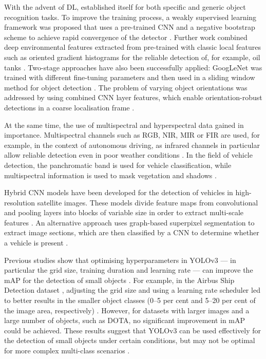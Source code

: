 With the advent of \Acrlong{DL},  established itself for both specific and generic object recognition tasks. To improve the training process, a weakly supervised learning framework was proposed that uses a pre-trained \acrshort{CNN} and a negative bootstrap scheme to achieve rapid convergence of the detector \cite{Zhou2016}. Further work combined deep environmental features extracted from pre-trained  with classic local features such as oriented gradient histograms \cite{Dalal2005} for the reliable detection of, for example, oil tanks \cite{Zhang2015}. Two-stage approaches have also been successfully applied: GoogLeNet was trained with different fine-tuning parameters and then used in a sliding window method for object detection \cite{Sevo2016}. The problem of varying object orientations was addressed by using combined \acrshort{CNN} layer features, which enable orientation-robust detections in a coarse localisation frame \cite{Zhu2015}.

At the same time, the use of multispectral and hyperspectral data gained in importance. Multispectral channels such as \acrshort{RGB}, \acrshort{NIR}, \Acrfull{MIR} or \Acrfull{FIR} are used, for example, in the context of autonomous driving, as infrared channels in particular allow reliable detection even in poor weather conditions \cite{Takumi2017}. In the field of vehicle detection, the panchromatic band is used for vehicle classification, while multispectral information is used to mask vegetation and shadows \cite{Eikvil2009}.

Hybrid \acrshort{CNN} models have been developed for the detection of vehicles in high-resolution satellite images. These models divide feature maps from convolutional and pooling layers into blocks of variable size in order to extract multi-scale features \cite{XueyunChen2014}. An alternative approach uses graph-based superpixel segmentation to extract image sections, which are then classified by a \acrshort{CNN} to determine whether a vehicle is present \cite{Jiang2015}.

Previous studies show that optimising hyperparameters in \acrshort{YOLO}v3  — in particular the grid size, training duration and learning rate — can improve the \acrfull{mAP} for the detection of small objects \cite{Balzer2022}. For example, in the Airbus Ship Detection dataset \cite{Airbus_Ship_Det}, adjusting the grid size and using a learning rate scheduler led to better results in the smaller object classes (0–5 per cent and 5–20 per cent of the image area, respectively) \cite{Balzer2022}. However, for datasets with larger images and a large number of objects, such as \acrshort{DOTA}, no significant improvement in \acrshort{mAP} could be achieved. These results suggest that \acrshort{YOLO}v3 can be used effectively for the detection of small objects under certain conditions, but may not be optimal for more complex multi-class scenarios \cite{Balzer2022}.

